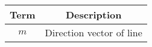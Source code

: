 \begin{tabular}[12ptx]{ |c| c|}
\hline\textbf{Term} & \textbf{Description}\\
\hline
$m$&Direction vector of line \\
\hline
\end{tabular}
